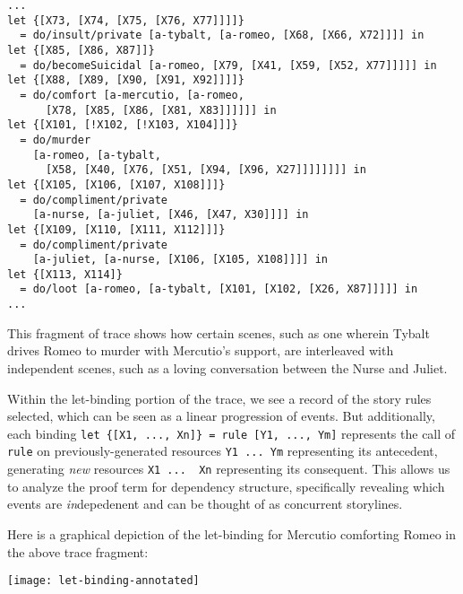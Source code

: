 \documentclass[letterpaper]{article}
\begin{document}
\begin{verbatim}
...
let {[X73, [X74, [X75, [X76, X77]]]]} 
  = do/insult/private [a-tybalt, [a-romeo, [X68, [X66, X72]]]] in 
let {[X85, [X86, X87]]} 
  = do/becomeSuicidal [a-romeo, [X79, [X41, [X59, [X52, X77]]]]] in 
let {[X88, [X89, [X90, [X91, X92]]]]} 
  = do/comfort [a-mercutio, [a-romeo, 
      [X78, [X85, [X86, [X81, X83]]]]]] in 
let {[X101, [!X102, [!X103, X104]]]} 
  = do/murder 
    [a-romeo, [a-tybalt, 
      [X58, [X40, [X76, [X51, [X94, [X96, X27]]]]]]]] in 
let {[X105, [X106, [X107, X108]]]} 
  = do/compliment/private 
    [a-nurse, [a-juliet, [X46, [X47, X30]]]] in 
let {[X109, [X110, [X111, X112]]]} 
  = do/compliment/private 
    [a-juliet, [a-nurse, [X106, [X105, X108]]]] in 
let {[X113, X114]} 
  = do/loot [a-romeo, [a-tybalt, [X101, [X102, [X26, X87]]]]] in
...
\end{verbatim}

This fragment of trace shows how certain scenes, such as one wherein Tybalt
drives Romeo to murder with Mercutio's support, are interleaved with
independent scenes, such as a loving conversation between the Nurse and
Juliet.

Within the let-binding portion of the trace, we see a record of the story
rules selected, which can be seen as a linear progression of events. But
additionally, each binding 
\verb|let {[X1, ..., Xn]} = rule [Y1, ..., Ym]| represents
the call of \verb|rule| on previously-generated resources \verb|Y1 ... Ym|
representing its antecedent, generating {\em new} resources 
\verb|X1 ...  Xn| representing its consequent. This allows us to analyze
the proof term for dependency structure, specifically revealing which
events are {\em in}depedenent and can be thought of as concurrent
storylines. 

Here is a graphical depiction of the let-binding for Mercutio comforting
Romeo in the above trace fragment:

\texttt{[image: let-binding-annotated]}


% 
\end{document}

